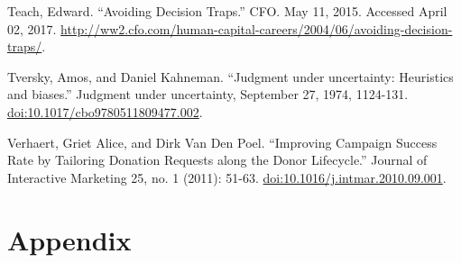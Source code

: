 \documentclass[]{article}
\begin{document}
Teach, Edward. ``Avoiding Decision Traps.'' CFO. May 11, 2015. Accessed
April 02, 2017.
\url{http://ww2.cfo.com/human-capital-careers/2004/06/avoiding-decision-traps/}.

Tversky, Amos, and Daniel Kahneman. ``Judgment under uncertainty:
Heuristics and biases.'' Judgment under uncertainty, September 27, 1974,
1124-131. \url{doi:10.1017/cbo9780511809477.002}.

Verhaert, Griet Alice, and Dirk Van Den Poel. ``Improving Campaign
Success Rate by Tailoring Donation Requests along the Donor Lifecycle.''
Journal of Interactive Marketing 25, no. 1 (2011): 51-63.
\url{doi:10.1016/j.intmar.2010.09.001}.

\newpage

\section{Appendix}\label{appendix}
\end{document}
